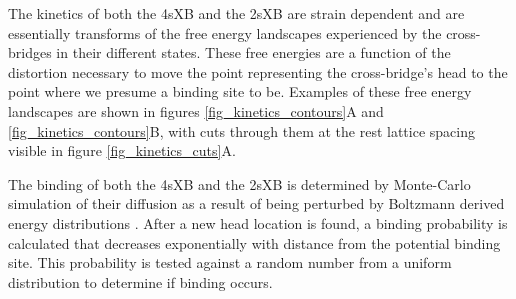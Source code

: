 \documentclass[]{article}
\begin{document}
The kinetics of both the 4sXB and the 2sXB are strain dependent and are essentially transforms of the free energy landscapes experienced by the cross-bridges in their different states.
These free energies are a function of the distortion necessary to move the point representing the cross-bridge's head to the point where we presume a binding site to be.
Examples of these free energy landscapes are shown in figures \ref{fig_kinetics_contours}A and \ref{fig_kinetics_contours}B, with cuts through them at the rest lattice spacing visible in figure \ref{fig_kinetics_cuts}A.

The binding of both the 4sXB and the 2sXB is determined by Monte-Carlo simulation of their diffusion as a result of being perturbed by Boltzmann derived energy distributions \citep{DillBook}. 
After a new head location is found, a binding probability is calculated that decreases exponentially with distance from the potential binding site. 
This probability is tested against a random number from a uniform distribution to determine if binding occurs.
\end{document}
